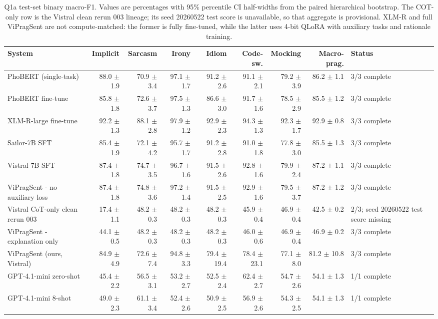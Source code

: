 \begin{table}[t]
\centering
\small
\setlength{\tabcolsep}{4pt}
\begin{tabular}{lrrrrrrrl}
\toprule
System & Implicit & Sarcasm & Irony & Idiom & Code-sw. & Mocking & Macro-prag. & Status \\
\midrule
PhoBERT (single-task) & 88.0 $\pm$ 1.9 & 70.9 $\pm$ 3.4 & 97.1 $\pm$ 1.7 & 91.2 $\pm$ 2.6 & 91.1 $\pm$ 2.1 & 79.2 $\pm$ 3.9 & 86.2 $\pm$ 1.1 & 3/3 complete \\
PhoBERT fine-tune & 85.8 $\pm$ 1.8 & 72.6 $\pm$ 3.7 & 97.5 $\pm$ 1.3 & 86.6 $\pm$ 3.0 & 91.7 $\pm$ 1.6 & 78.5 $\pm$ 2.9 & 85.5 $\pm$ 1.2 & 3/3 complete \\
XLM-R-large fine-tune & 92.2 $\pm$ 1.3 & 88.1 $\pm$ 2.8 & 97.9 $\pm$ 1.2 & 92.9 $\pm$ 2.3 & 94.3 $\pm$ 1.3 & 92.3 $\pm$ 1.7 & 92.9 $\pm$ 0.8 & 3/3 complete \\
Sailor-7B SFT & 85.4 $\pm$ 1.9 & 72.1 $\pm$ 4.2 & 95.7 $\pm$ 1.7 & 91.2 $\pm$ 2.8 & 91.0 $\pm$ 1.8 & 77.8 $\pm$ 3.0 & 85.5 $\pm$ 1.3 & 3/3 complete \\
Vistral-7B SFT & 87.4 $\pm$ 1.8 & 74.7 $\pm$ 3.5 & 96.7 $\pm$ 1.6 & 91.5 $\pm$ 2.6 & 92.8 $\pm$ 1.6 & 79.9 $\pm$ 2.4 & 87.2 $\pm$ 1.1 & 3/3 complete \\
ViPragSent - no auxiliary loss & 87.4 $\pm$ 1.8 & 74.8 $\pm$ 3.6 & 97.2 $\pm$ 1.4 & 91.5 $\pm$ 2.5 & 92.9 $\pm$ 1.6 & 79.5 $\pm$ 3.7 & 87.2 $\pm$ 1.2 & 3/3 complete \\
Vistral CoT-only clean rerun 003 & 17.4 $\pm$ 1.1 & 48.2 $\pm$ 0.3 & 48.2 $\pm$ 0.3 & 48.2 $\pm$ 0.3 & 45.9 $\pm$ 0.4 & 46.9 $\pm$ 0.4 & 42.5 $\pm$ 0.2 & 2/3; seed 20260522 test score missing \\
ViPragSent - explanation only & 44.1 $\pm$ 0.5 & 48.2 $\pm$ 0.3 & 48.2 $\pm$ 0.3 & 48.2 $\pm$ 0.3 & 46.0 $\pm$ 0.6 & 46.9 $\pm$ 0.4 & 46.9 $\pm$ 0.2 & 3/3 complete \\
ViPragSent (ours, Vistral) & 84.9 $\pm$ 4.9 & 72.6 $\pm$ 7.4 & 94.8 $\pm$ 3.3 & 79.4 $\pm$ 19.4 & 78.4 $\pm$ 23.1 & 77.1 $\pm$ 8.0 & 81.2 $\pm$ 10.8 & 3/3 complete \\
GPT-4.1-mini zero-shot & 45.4 $\pm$ 2.2 & 56.5 $\pm$ 3.1 & 53.2 $\pm$ 2.7 & 52.5 $\pm$ 2.4 & 62.4 $\pm$ 2.7 & 54.7 $\pm$ 2.6 & 54.1 $\pm$ 1.3 & 1/1 complete \\
GPT-4.1-mini 8-shot & 49.0 $\pm$ 2.3 & 61.1 $\pm$ 3.4 & 52.4 $\pm$ 2.6 & 50.9 $\pm$ 2.5 & 56.9 $\pm$ 2.6 & 54.3 $\pm$ 2.5 & 54.1 $\pm$ 1.3 & 1/1 complete \\
\bottomrule
\end{tabular}
\caption{Q1a test-set binary macro-F1. Values are percentages with 95\% percentile CI half-widths from the paired hierarchical bootstrap. The COT-only row is the Vistral clean rerun 003 lineage; its seed 20260522 test score is unavailable, so that aggregate is provisional. XLM-R and full ViPragSent are not compute-matched: the former is fully fine-tuned, while the latter uses 4-bit QLoRA with auxiliary tasks and rationale training.}
\label{tab:q1a-best-f1}
\end{table}
